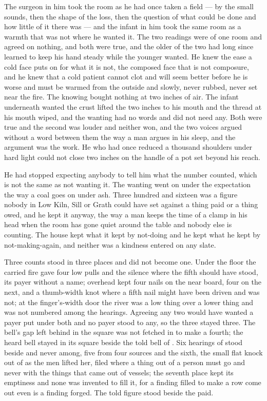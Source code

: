 The surgeon in him took the room as he had once taken a field --- by the small sounds, then the shape of the loss, then the question of what could be done and how little of it there was --- and the infant in him took the same room as a warmth that was not where he wanted it. The two readings were of one room and agreed on nothing, and both were true, and the older of the two had long since learned to keep his hand steady while the younger wanted. He knew the ease a cold face puts on for what it is not, the composed face that is not composure, and he knew that a cold patient cannot clot and will seem better before he is worse and must be warmed from the outside and slowly, never rubbed, never set near the fire. The knowing bought nothing at two inches of air. The infant underneath wanted the crust lifted the two inches to his mouth and the thread at his mouth wiped, and the wanting had no words and did not need any. Both were true and the second was louder and neither won, and the two voices argued without a word between them the way a man argues in his sleep, and the argument was the work. He who had once reduced a thousand shoulders under hard light could not close two inches on the handle of a pot set beyond his reach.

He had stopped expecting anybody to tell him what the number counted, which is not the same as not wanting it. The wanting went on under the expectation the way a coal goes on under ash. Three hundred and sixteen was a figure nobody in Low Kiln, Sill or Grath could have set against a thing paid or a thing owed, and he kept it anyway, the way a man keeps the time of a clamp in his head when the room has gone quiet around the table and nobody else is counting. The house kept what it kept by not-doing and he kept what he kept by not-making-again, and neither was a kindness entered on any slate.

Three counts stood in three places and did not become one. Under the floor the carried fire gave four low pulls and the silence where the fifth should have stood, its payer without a name; overhead  kept four nails on the near board, four on the next, and a thumb-width knot where a fifth nail might have been driven and was not; at the finger's-width door the river was a low thing over a lower thing and was not numbered among the hearings. Agreeing any two would have wanted a payer put under both and no payer stood to any, so the three stayed three. The bell's gap left behind in the square was not fetched in to make a fourth; the heard bell stayed in its square beside the told bell of . Six hearings of  stood beside and never among, five from four sources and the sixth, the small flat knock out of  as the men lifted her, filed where a thing out of a person must go and never with the things that came out of vessels; the seventh place kept its emptiness and none was invented to fill it, for a finding filled to make a row come out even is a finding forged. The told figure stood beside the paid.

